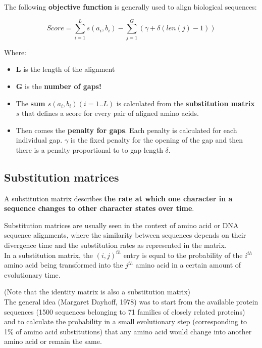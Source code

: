 The following \textbf{objective function} is generally used to align biological
sequences:

\begin{equation}
Score = \sum_{i=1}^{L} s(a_i,b_i) - \sum_{j=1}^{G} (\gamma + \delta(len(j)-1))
\end{equation}

Where:
\begin{itemize}
  \item \textbf{L} is the length of the alignment
  \item \textbf{G} is the \textbf{number of gaps!}
  \item The \textbf{sum $s(a_i,b_i) (i=1..L) $} is calculated from the
\textbf{substitution matrix} $s$ that defines a score for every pair of aligned
amino acids.
  \item Then comes the \textbf{penalty for gaps}. Each penalty is calculated
 for each individual gap. \textbf{$\gamma$} is the fixed penalty for the
 opening of the gap and then there is a penalty proportional to to gap length
\textbf{$\delta$}.
\end{itemize}

\subsection{Substitution matrices}

A substitution matrix describes \textbf{the rate at which one character in a
sequence changes to other character states over time}.

Substitution matrices are usually seen in the context of amino acid or DNA
sequence alignments, where the similarity between sequences depends on their
divergence time and the substitution rates as represented in the matrix. \\

In a substitution matrix, the $(i,j)^{th}$ entry is equal to the probability of
the $i^{th}$ amino acid being transformed into the $j^{th}$ amino acid in a
certain amount of evolutionary time.

(Note that the identity matrix is also a substitution matrix) \\

The general idea (Margaret Dayhoff, 1978) was to start from the available
protein sequences (1500 sequences belonging to 71 families of closely related
proteins) and to calculate the probability in a small evolutionary step
(corresponding to 1\% of amino acid substitutions) that any amino acid would
change into another amino acid or remain the same.

